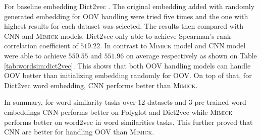     For baseline embedding Dict2vec \citep{dict2vect2017tissier}. The
    original embedding added with randomly generated embedding for OOV
    handling were tried five times and the one with highest results
    for each dataset was selected. The results then compared with CNN
    and \textsc{Mimick} models. Dict2vec only able to achieve
    Spearman's rank correlation coefficient of $519.22$. In contrast to
    \textsc{Mimick} model and CNN model were able to achieve $550.55$
    and $551.96$ on average respectively as shown on Table
    \ref{tab:wordsim:dict2vec}. This shows that both OOV handling
    models can handle OOV better than initializing embedding randomly
    for OOV. On top of that, for Dict2vec word embedding, CNN performs
    better than \textsc{Mimick}.

    In summary, for word similarity tasks over 12 datasets and 3
    pre-trained word embeddings CNN performs better on Polyglot and
    Dict2vec while \textsc{Mimick} performs better on word2vec in word
    similarities tasks. This further proved that CNN are better for
    handling OOV than \textsc{Mimick}.